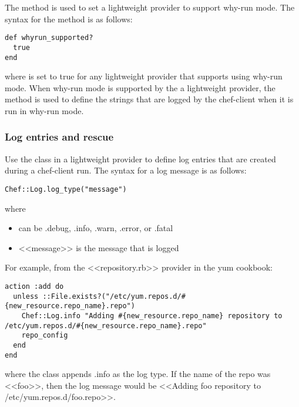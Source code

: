 The  method is used to set a lightweight provider to support why-run mode. The syntax for the  method is as follows:

\begin{lstlisting}[label=lst:cookbook-lwrp-why-run]
def whyrun_supported?
  true
end
\end{lstlisting}

where  is set to true for any lightweight provider that supports using why-run mode. When why-run mode is supported by the a lightweight provider, the  method is used to define the strings that are logged by the chef-client when it is run in why-run mode.

\subsubsection{Log entries and rescue}

Use the  class in a lightweight provider to define log entries that are created during a chef-client run. The syntax for a log message is as follows:

\begin{lstlisting}[label=lst:cookbook-lwrp-logs1]
Chef::Log.log_type("message")
\end{lstlisting}

where

\begin{itemize}
  \item {} can be .debug, .info, .warn, .error, or .fatal
  \item <<message>> is the message that is logged
\end{itemize}

For example, from the <<repository.rb>> provider in the yum cookbook:

\begin{lstlisting}[label=lst:cookbook-lwrp-logs2]
action :add do
  unless ::File.exists?("/etc/yum.repos.d/#{new_resource.repo_name}.repo")
    Chef::Log.info "Adding #{new_resource.repo_name} repository to /etc/yum.repos.d/#{new_resource.repo_name}.repo"
    repo_config
  end
end
\end{lstlisting}

where the  class appends .info as the log type. If the name of the repo was <<foo>>, then the log message would be <<Adding foo repository to /etc/yum.repos.d/foo.repo>>.

